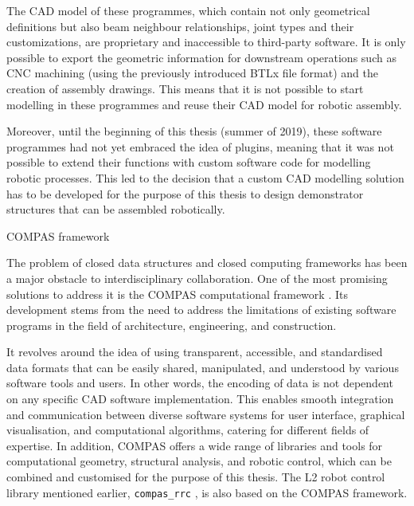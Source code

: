 The CAD model of these programmes, which contain not only geometrical definitions but also beam neighbour relationships, joint types and their customizations, are proprietary and inaccessible to third-party software. It is only possible to export the geometric information for downstream operations such as CNC machining (using the previously introduced BTLx file format) and the creation of assembly drawings. This means that it is not possible to start modelling in these programmes and reuse their CAD model for robotic assembly. 

Moreover, until the beginning of this thesis (summer of 2019), these software programmes had not yet embraced the idea of plugins, meaning that it was not possible to extend their functions with custom software code for modelling robotic processes. This led to the decision that a custom CAD modelling solution has to be developed for the purpose of this thesis to design demonstrator structures that can be assembled robotically.

COMPAS framework

The problem of closed data structures and closed computing frameworks has been a major obstacle to interdisciplinary collaboration. One of the most promising solutions to address it is the COMPAS computational framework \parencite{meleCOMPASFrameworkComputational2017}. Its development stems from the need to address the limitations of existing software programs in the field of architecture, engineering, and construction.

It revolves around the idea of using transparent, accessible, and standardised data formats that can be easily shared, manipulated, and understood by various software tools and users. In other words, the encoding of data is not dependent on any specific CAD software implementation. This enables smooth integration and communication between diverse software systems for user interface, graphical visualisation, and computational algorithms, catering for different fields of expertise. In addition, COMPAS offers a wide range of libraries and tools for computational geometry, structural analysis, and robotic control, which can be combined and customised for the purpose of this thesis. The L2 robot control library mentioned earlier, \verb|compas_rrc| \parencite{fleischmannCOMPASRRCOnline2020} , is also based on the COMPAS framework.

